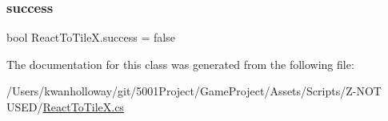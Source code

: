\subsubsection{\texorpdfstring{success}{success}}
{\footnotesize\ttfamily bool React\+To\+Tile\+X.\+success = false}



The documentation for this class was generated from the following file\+:\begin{DoxyCompactItemize}
\item 
/\+Users/kwanholloway/git/5001\+Project/\+Game\+Project/\+Assets/\+Scripts/\+Z-\/\+N\+O\+T U\+S\+E\+D/\hyperlink{_react_to_tile_x_8cs}{React\+To\+Tile\+X.\+cs}\end{DoxyCompactItemize}
